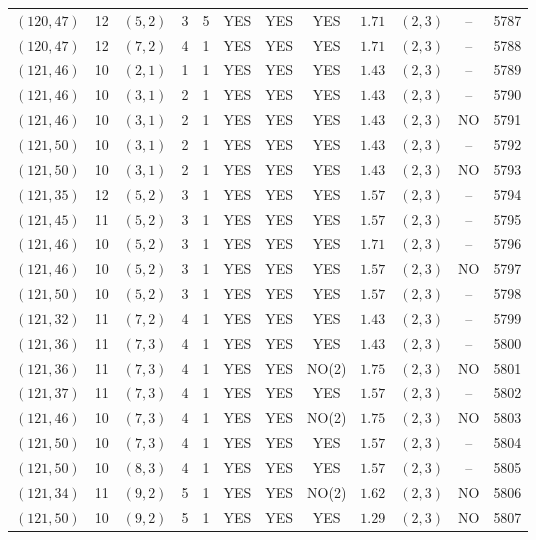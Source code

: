 \begin{longtable}{|c|c|c|c|c|c|c|c|c|c|c|c|}
$(120,47)$ & 12 & $(5,2)$ & 3 & 5 & YES & YES & YES & $1.71$ & $(2,3)$ & -- & 5787\\
$(120,47)$ & 12 & $(7,2)$ & 4 & 1 & YES & YES & YES & $1.71$ & $(2,3)$ & -- & 5788\\
$(121,46)$ & 10 & $(2,1)$ & 1 & 1 & YES & YES & YES & $1.43$ & $(2,3)$ & -- & 5789\\
$(121,46)$ & 10 & $(3,1)$ & 2 & 1 & YES & YES & YES & $1.43$ & $(2,3)$ & -- & 5790\\
$(121,46)$ & 10 & $(3,1)$ & 2 & 1 & YES & YES & YES & $1.43$ & $(2,3)$ & NO & 5791\\
$(121,50)$ & 10 & $(3,1)$ & 2 & 1 & YES & YES & YES & $1.43$ & $(2,3)$ & -- & 5792\\
$(121,50)$ & 10 & $(3,1)$ & 2 & 1 & YES & YES & YES & $1.43$ & $(2,3)$ & NO & 5793\\
$(121,35)$ & 12 & $(5,2)$ & 3 & 1 & YES & YES & YES & $1.57$ & $(2,3)$ & -- & 5794\\
$(121,45)$ & 11 & $(5,2)$ & 3 & 1 & YES & YES & YES & $1.57$ & $(2,3)$ & -- & 5795\\
$(121,46)$ & 10 & $(5,2)$ & 3 & 1 & YES & YES & YES & $1.71$ & $(2,3)$ & -- & 5796\\
$(121,46)$ & 10 & $(5,2)$ & 3 & 1 & YES & YES & YES & $1.57$ & $(2,3)$ & NO & 5797\\
$(121,50)$ & 10 & $(5,2)$ & 3 & 1 & YES & YES & YES & $1.57$ & $(2,3)$ & -- & 5798\\
$(121,32)$ & 11 & $(7,2)$ & 4 & 1 & YES & YES & YES & $1.43$ & $(2,3)$ & -- & 5799\\
$(121,36)$ & 11 & $(7,3)$ & 4 & 1 & YES & YES & YES & $1.43$ & $(2,3)$ & -- & 5800\\
$(121,36)$ & 11 & $(7,3)$ & 4 & 1 & YES & YES & NO(2) & $1.75$ & $(2,3)$ & NO & 5801\\
$(121,37)$ & 11 & $(7,3)$ & 4 & 1 & YES & YES & YES & $1.57$ & $(2,3)$ & -- & 5802\\
$(121,46)$ & 10 & $(7,3)$ & 4 & 1 & YES & YES & NO(2) & $1.75$ & $(2,3)$ & NO & 5803\\
$(121,50)$ & 10 & $(7,3)$ & 4 & 1 & YES & YES & YES & $1.57$ & $(2,3)$ & -- & 5804\\
$(121,50)$ & 10 & $(8,3)$ & 4 & 1 & YES & YES & YES & $1.57$ & $(2,3)$ & -- & 5805\\
$(121,34)$ & 11 & $(9,2)$ & 5 & 1 & YES & YES & NO(2) & $1.62$ & $(2,3)$ & NO & 5806\\
$(121,50)$ & 10 & $(9,2)$ & 5 & 1 & YES & YES & YES & $1.29$ & $(2,3)$ & NO & 5807\\

\end{longtable}
